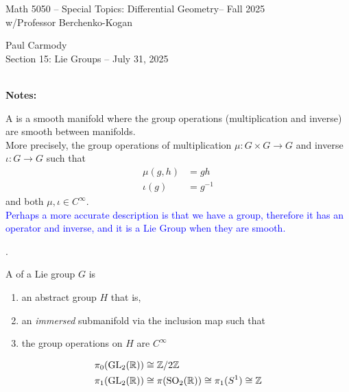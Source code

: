 \documentclass[12pt,a4paper]{report}
\newcommand{\CLASSNAME}{Math 5050 -- Special Topics: Differential Geometry}
\newcommand{\STUDENTNAME}{Paul Carmody}
\newcommand{\ASSIGNMENT}{Section 15: Lie Groups }
\newcommand{\DUEDATE}{July 31, 2025}
\newcommand{\PROFESSOR}{Professor Berchenko-Kogan}
\newcommand{\SEMESTER}{Fall 2025}
\newcommand{\BLUE}[1]{\textcolor{blue}{#1}}
\begin{document}
\begin{center}
	\Large{\CLASSNAME -- \SEMESTER} \\
	\large{ w/\PROFESSOR}
\end{center}
\begin{center}
	\STUDENTNAME \\
	\ASSIGNMENT -- \DUEDATE\\
\end{center} 

\noindent \textbf{\\\large{Notes:}}
\begin{definition} A  is a smooth manifold where the group operations (multiplication and inverse) are smooth between manifolds.\\

\noindent More precisely, the group operations of multiplication $\mu: G\times G \to G$ and inverse $\iota: G \to G$ such that 
\begin{align*}
	\mu(g,h) &= gh \\
	\iota(g) &= g^{-1}
\end{align*}and both $\mu, \iota \in C^\infty$.\\

\BLUE{Perhaps a more accurate description is that we have a group, therefore it has an operator and inverse, and it is a Lie Group when they are smooth.
}
\end{definition}

\begin{definition}.

A  of a Lie group $G$ is 
\begin{enumerate}[label=(\roman*)]

	\item an abstract group $H$ that is,
	\item an \textit{immersed} submanifold via the inclusion map such that
	\item the group operations on $H$ are $C^\infty$

\end{enumerate}
\end{definition}

\HLINE
\begin{remark}
\newcommand{\GL}{\operatorname{GL}}
\newcommand{\SO}{\operatorname{SO}}
\begin{align*}
	\pi_0(\GL_2(\R)) &\cong \Z/2\Z \\
	\pi_1(\GL_2(\R)) &\cong \pi(\SO_2(\R)) \cong \pi_1(S^1) \cong \Z
\end{align*}
\end{remark}
\end{document}
